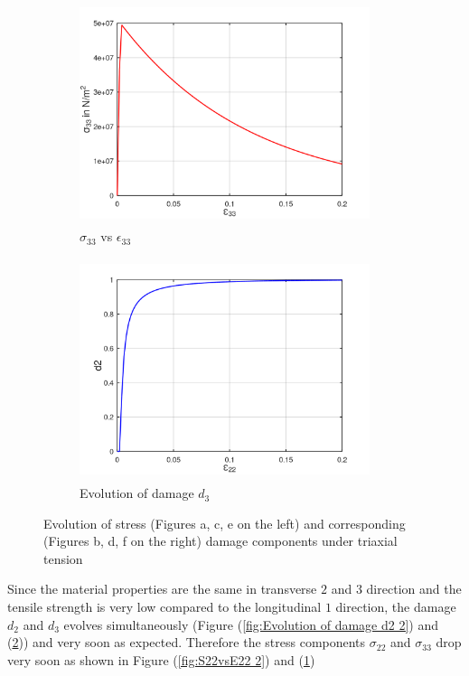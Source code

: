 \documentclass[12pt,a4paper,twoside,openright]{report}
\begin{document}
\begin{figure}[htbp!]\ContinuedFloat
     \begin{subfigure}{0.4\textwidth}
         \includegraphics[width=8.5cm,height=6.5cm]{24.S33vsE33.png}
         \caption{$\sigma_{33}$ vs $\epsilon_{33}$}
         \label{fig:S33vsE33}
     \end{subfigure}
     \hspace{1.5cm}
     \begin{subfigure}{0.4\textwidth}
         \includegraphics[width=8.5cm,height=6.5cm]{24.d2.png}
         \caption{Evolution of damage $d_{3}$}
         \label{fig:Evolution of damage d3}
     \end{subfigure}     
        \caption{Evolution of stress (Figures a, c, e on the left) and corresponding (Figures b, d, f on the right) damage components under triaxial tension}
        \label{fig:Evolution of damage under triaxial tension}     
\end{figure}
\FloatBarrier
Since the material properties are the same in transverse $2$ and $3$ direction and the tensile strength is very low compared to the longitudinal $1$ direction, the damage $d_{2}$ and $d_{3}$ evolves simultaneously (Figure (\ref{fig:Evolution of damage d2 2}) and (\ref{fig:Evolution of damage d3})) and very soon as expected. Therefore the stress components $\sigma_{22}$ and $\sigma_{33}$ drop very soon as shown in Figure (\ref{fig:S22vsE22 2}) and (\ref{fig:S33vsE33}) 
\end{document}
